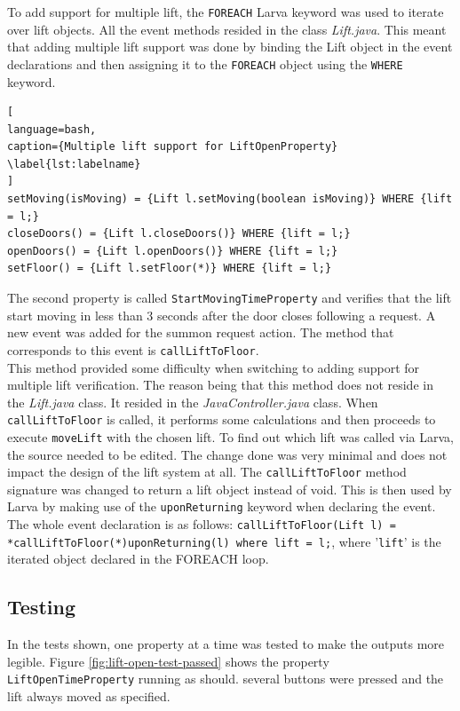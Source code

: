 \documentclass[a4paper, 12pt]{article}
\begin{document}
To add support for multiple lift, the \texttt{FOREACH} Larva keyword was used to iterate over lift objects. All the event methods resided in the class \textit{Lift.java}. This meant that adding multiple lift support was done by binding the Lift object in the event declarations and then assigning it to the \texttt{FOREACH} object using the \texttt{WHERE} keyword.


\begin{lstlisting}[
language=bash, 
caption={Multiple lift support for LiftOpenProperty}
\label{lst:labelname}
]
setMoving(isMoving) = {Lift l.setMoving(boolean isMoving)} WHERE {lift = l;} 
closeDoors() = {Lift l.closeDoors()} WHERE {lift = l;}
openDoors() = {Lift l.openDoors()} WHERE {lift = l;}
setFloor() = {Lift l.setFloor(*)} WHERE {lift = l;}
\end{lstlisting}

The second property is called \texttt{StartMovingTimeProperty} and verifies that the lift start moving in less than 3 seconds after the door closes following a request. A new event was added for the summon request action. The method that corresponds to this event is \texttt{callLiftToFloor}. \\

This method provided some difficulty when switching to adding support for multiple lift verification. The reason being that this method does not reside in the \textit{Lift.java} class. It resided in the \textit{JavaController.java} class. When \texttt{callLiftToFloor} is called, it performs some calculations and then proceeds to execute \texttt{moveLift} with the chosen lift. To find out which lift was called via Larva, the source needed to be edited. The change done was very minimal and does not impact the design of the lift system at all. The \texttt{callLiftToFloor} method signature was changed to return a lift object instead of void. This is then used by Larva by making use of the \texttt{uponReturning} keyword when declaring the event. The whole event declaration is as follows: \newline\texttt{callLiftToFloor(Lift l) = {*callLiftToFloor(*)uponReturning(l)} where {lift = l;}}, where '\texttt{lift}' is the iterated object declared in the FOREACH loop. 

\subsection{Testing}
In the tests shown, one property at a time was tested to make the outputs more legible. Figure \ref{fig:lift-open-test-passed} shows the property \texttt{LiftOpenTimeProperty} running as should. several buttons were pressed and the lift always moved as specified. \\
\end{document}
